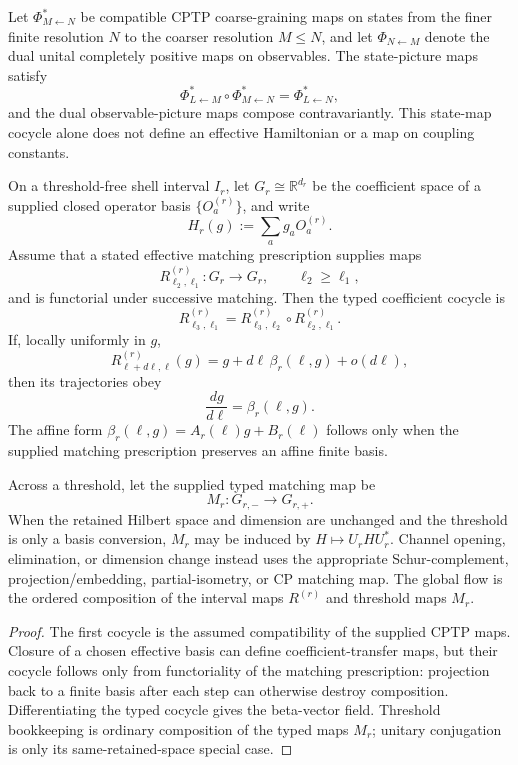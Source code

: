 \documentclass[12pt,a4paper]{article}
\begin{document}
\begin{theorem}
\label{p4:thm:renormalization-semigroup}
\leavevmode\par\noindent
Let \(\Phi^*_{M\leftarrow N}\) be compatible CPTP coarse-graining maps on states
from the finer finite resolution \(N\) to the coarser resolution \(M\le N\), and
let \(\Phi_{N\leftarrow M}\) denote the dual unital completely positive maps on
observables.  The state-picture maps satisfy
\[
\Phi^*_{L\leftarrow M}\circ \Phi^*_{M\leftarrow N}
=
\Phi^*_{L\leftarrow N},
\]
and the dual observable-picture maps compose contravariantly.
This state-map cocycle alone does not define an effective Hamiltonian or a
map on coupling constants.

On a threshold-free shell interval \(I_r\), let
\(G_r\cong\mathbb R^{d_r}\) be the coefficient space of a supplied closed
operator basis \(\{O_a^{(r)}\}\), and write
\[
H_r(g):=\sum_a g_aO_a^{(r)}.
\]
Assume that a stated effective matching prescription supplies maps
\[
R^{(r)}_{\ell_2,\ell_1}:G_r\longrightarrow G_r,
\qquad \ell_2\ge\ell_1,
\]
and is functorial under successive matching.  Then the typed coefficient
cocycle is
\[
R^{(r)}_{\ell_3,\ell_1}
=
R^{(r)}_{\ell_3,\ell_2}\circ R^{(r)}_{\ell_2,\ell_1}.
\]
If, locally uniformly in \(g\),
\[
R^{(r)}_{\ell+d\ell,\ell}(g)
=
g+d\ell\,\beta_r(\ell,g)+o(d\ell),
\]
then its trajectories obey
\[
\frac{dg}{d\ell}=\beta_r(\ell,g).
\]
The affine form
\(\beta_r(\ell,g)=A_r(\ell)g+B_r(\ell)\) follows only when the supplied
matching prescription preserves an affine finite basis.

Across a threshold, let the supplied typed matching map be
\[
M_r:G_{r,-}\longrightarrow G_{r,+}.
\]
When the retained Hilbert space and dimension are unchanged and the
threshold is only a basis conversion, \(M_r\) may be induced by
\(H\mapsto U_rHU_r^*\).  Channel opening, elimination, or dimension change
instead uses the appropriate Schur-complement, projection/embedding,
partial-isometry, or CP matching map.  The global flow is the ordered
composition of the interval maps \(R^{(r)}\) and threshold maps \(M_r\).
\end{theorem}


\begin{proof}
The first cocycle is the assumed compatibility of the supplied CPTP maps.
Closure of a chosen effective basis can define coefficient-transfer maps,
but their cocycle follows only from functoriality of the matching
prescription: projection back to a finite basis after each step can
otherwise destroy composition.  Differentiating the typed cocycle gives
the beta-vector field.  Threshold bookkeeping is ordinary composition of
the typed maps \(M_r\); unitary conjugation is only its
same-retained-space special case. \qedhere
\end{proof}
\end{document}
